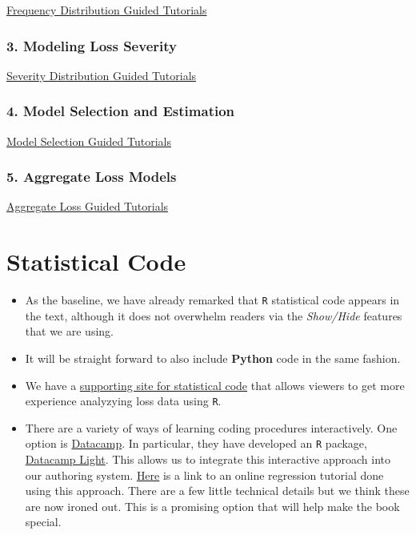 \documentclass[]{article}
\begin{document}
\href{https://www.ssc.wisc.edu/~jfrees/loss-data-analytics/loss-data-analytics-problems/}{Frequency
Distribution Guided Tutorials}

\subsubsection{3. Modeling Loss
Severity}\label{modeling-loss-severity-1}

\href{http://www.ssc.wisc.edu/~jfrees/loss-data-analytics/chapter-3-modeling-loss-severity/loss-data-analytics-severity-problems/}{Severity
Distribution Guided Tutorials}

\subsubsection{4. Model Selection and
Estimation}\label{model-selection-and-estimation-1}

\href{http://www.ssc.wisc.edu/~jfrees/loss-data-analytics/loss-data-analytics-model-selection/}{Model
Selection Guided Tutorials}

\subsubsection{5. Aggregate Loss Models}\label{aggregate-loss-models-1}

\href{https://www.ssc.wisc.edu/~jfrees/loss-data-analytics/aggregate-loss-guided-tutorials/}{Aggregate
Loss Guided Tutorials}

\section{Statistical Code}\label{S:StatisticalCode}

\begin{itemize}
\item
  As the baseline, we have already remarked that \texttt{R} statistical
  code appears in the text, although it does not overwhelm readers via
  the \emph{Show/Hide} features that we are using.
\item
  It will be straight forward to also include \textbf{Python} code in
  the same fashion.
\item
  We have a
  \href{https://ewfrees.github.io/LDARcode/index.html}{supporting site
  for statistical code} that allows viewers to get more experience
  analyzying loss data using \texttt{R}.
\item
  There are a variety of ways of learning coding procedures
  interactively. One option is
  \href{https://www.datacamp.com}{Datacamp}. In particular, they have
  developed an \texttt{R} package,
  \href{https://support.datacamp.com/hc/en-us/articles/360007749853-What-is-DataCamp-Light-}{Datacamp
  Light}. This allows us to integrate this interactive approach into our
  authoring system.
  \href{https://ewfreesres.github.io/RegressModel/index.html}{Here} is a
  link to an online regression tutorial done using this approach. There
  are a few little technical details but we think these are now ironed
  out. This is a promising option that will help make the book special.
\end{itemize}
\end{document}
